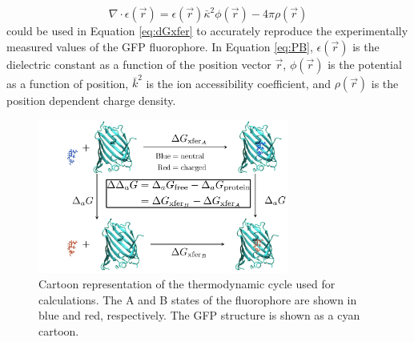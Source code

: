 \begin{equation}
    \nabla \cdot \epsilon(\vec{r}) = \epsilon(\vec{r})\bar{\kappa}^2\phi(\vec{r}) - 4\pi\rho(\vec{r})
    \label{eq:PB}
\end{equation}
could be used in Equation \ref{eq:dGxfer} to accurately reproduce the experimentally measured \pKa{} values of the GFP fluorophore. 
In Equation \ref{eq:PB}, $\epsilon(\vec{r})$ is the dielectric constant as a function of the position vector $\vec{r}$, $\phi(\vec{r})$ is the potential as a function of position, $\bar{k}^2$  is the ion accessibility coefficient, and $\rho(\vec{r})$ is the position dependent charge density. 

\begin{figure}
    \center
    \includegraphics[width=3.25in]{figures-gfp-pKa/thermocycle.png}
    \caption{Cartoon representation of the thermodynamic cycle used for \pKa{} calculations. The A and B states of the fluorophore are shown in blue and red, respectively. The GFP structure is shown as a cyan cartoon.}
    \label{fig:thermocycle}
\end{figure}

